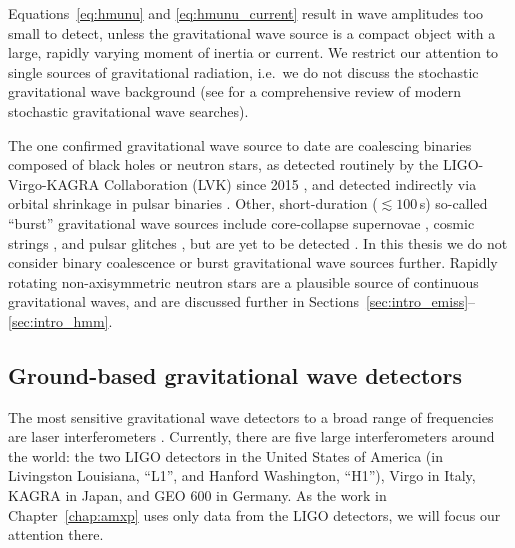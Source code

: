 Equations~\eqref{eq:hmunu} and \eqref{eq:hmunu_current} result in wave amplitudes too small to detect, unless the gravitational wave source is a compact object with a large, rapidly varying moment of inertia or current. We restrict our attention to single sources of gravitational radiation, i.e.~we do not discuss the stochastic gravitational wave background (see \citet{Renzini2022} for a comprehensive review of modern stochastic gravitational wave searches). 

The one confirmed gravitational wave source to date are coalescing binaries composed of black holes or neutron stars, as detected routinely by the LIGO-Virgo-KAGRA Collaboration (LVK) since 2015 \citep{150914obs,gwtc3}, and detected indirectly via orbital shrinkage in pulsar binaries \citep{Weisberg1981}. Other, short-duration ($\lesssim 100\,$s) so-called ``burst'' gravitational wave sources include core-collapse supernovae \citep{Powell2019,Radice2019}, cosmic strings \citep{Vachaspati1985,Sakellariadou1990}, and pulsar glitches \citep{Warszawski2012a,Yim2020,Ho2020a}, but are yet to be detected \citep{o3aburst,o3aburst_string}. In this thesis we do not consider binary coalescence or burst gravitational wave sources further. Rapidly rotating non-axisymmetric neutron stars are a plausible source of continuous gravitational waves, and are discussed further in Sections~\ref{sec:intro_emiss}--\ref{sec:intro_hmm}. 

\subsection{Ground-based gravitational wave detectors} \label{sec:intro_det}
The most sensitive gravitational wave detectors to a broad range of frequencies are laser interferometers \citep{Weiss1972}. Currently, there are five large interferometers around the world: the two LIGO detectors in the United States of America (in Livingston Louisiana, ``L1'', and Hanford Washington, ``H1''), Virgo in Italy, KAGRA in Japan, and GEO 600 in Germany. As the work in Chapter~\ref{chap:amxp} uses only data from the LIGO detectors, we will focus our attention there.

